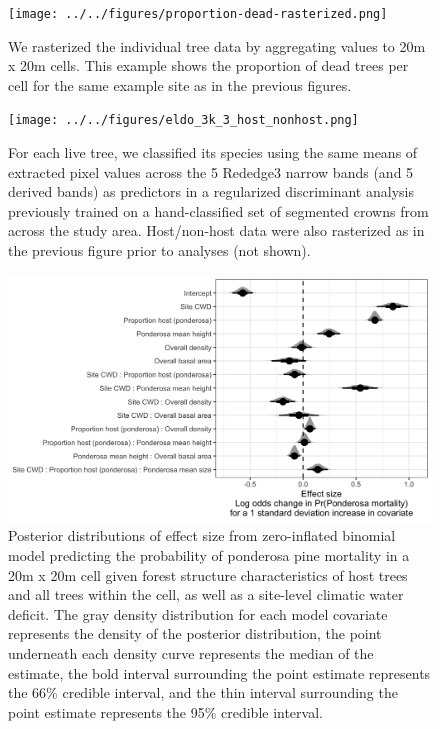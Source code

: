 \documentclass[]{article}
\begin{document}
\begin{figure}
\centering
\texttt{[image: ../../figures/proportion-dead-rasterized.png]}
\caption{We rasterized the individual tree data by aggregating values to
20m x 20m cells. This example shows the proportion of dead trees per
cell for the same example site as in the previous figures.}
\end{figure}

\begin{figure}
\centering
\texttt{[image: ../../figures/eldo\_3k\_3\_host\_nonhost.png]}
\caption{For each live tree, we classified its species using the same
means of extracted pixel values across the 5 Rededge3 narrow bands (and
5 derived bands) as predictors in a regularized discriminant analysis
previously trained on a hand-classified set of segmented crowns from
across the study area. Host/non-host data were also rasterized as in the
previous figure prior to analyses (not shown).}
\end{figure}

\begin{figure}
\centering
\includegraphics{../../figures/effect-sizes-halfeye.png}
\caption{Posterior distributions of effect size from zero-inflated
binomial model predicting the probability of ponderosa pine mortality in
a 20m x 20m cell given forest structure characteristics of host trees
and all trees within the cell, as well as a site-level climatic water
deficit. The gray density distribution for each model covariate
represents the density of the posterior distribution, the point
underneath each density curve represents the median of the estimate, the
bold interval surrounding the point estimate represents the 66\%
credible interval, and the thin interval surrounding the point estimate
represents the 95\% credible interval.}
\end{figure}
\end{document}
